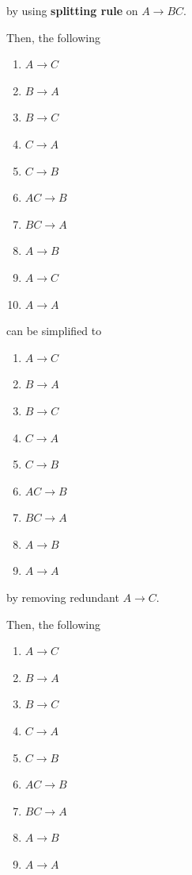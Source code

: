 \documentclass[12pt]{article}
\begin{document}
\begin{enumerate}[1.]
\begin{enumerate}[1.]
            by using \textbf{splitting rule} on $A \to BC$.

            \bigskip

            Then, the following

            \begin{enumerate}[1.]
                \item $A \to C$
                \item $B \to A$
                \item $B \to C$
                \item $C \to A$
                \item $C \to B$
                \item $AC \to B$
                \item $BC \to A$
                \item $A \to B$
                \item $A \to C$
                \item $A \to A$
            \end{enumerate}

            can be simplified to

            \begin{enumerate}[1.]
                \item $A \to C$
                \item $B \to A$
                \item $B \to C$
                \item $C \to A$
                \item $C \to B$
                \item $AC \to B$
                \item $BC \to A$
                \item $A \to B$
                \item $A \to A$
            \end{enumerate}

            by removing redundant $A \to C$.

            \bigskip

            Then, the following

            \begin{enumerate}[1.]
                \item $A \to C$
                \item $B \to A$
                \item $B \to C$
                \item $C \to A$
                \item $C \to B$
                \item $AC \to B$
                \item $BC \to A$
                \item $A \to B$
                \item $A \to A$
            \end{enumerate}


\end{enumerate}
\end{enumerate}
\end{document}
